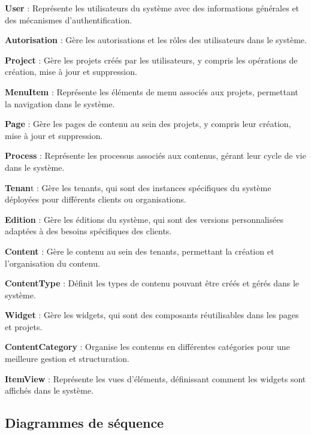 \textbf{User} : Représente les utilisateurs du système avec des informations générales et des mécanismes d'authentification.

\textbf{Autorisation} : Gère les autorisations et les rôles des utilisateurs dans le système.

\textbf{Project} : Gère les projets créés par les utilisateurs, y compris les opérations de création, mise à jour et suppression.

\textbf{MenuItem} : Représente les éléments de menu associés aux projets, permettant la navigation dans le système.

\textbf{Page} : Gère les pages de contenu au sein des projets, y compris leur création, mise à jour et suppression.

\textbf{Process} : Représente les processus associés aux contenus, gérant leur cycle de vie dans le système.

\textbf{Tenan}t : Gère les tenants, qui sont des instances spécifiques du système déployées pour différents clients ou organisations.

\textbf{Edition} : Gère les éditions du système, qui sont des versions personnalisées adaptées à des besoins spécifiques des clients.

\textbf{Content} : Gère le contenu au sein des tenants, permettant la création et l'organisation du contenu.

\textbf{ContentType} : Définit les types de contenu pouvant être créés et gérés dans le système.

\textbf{Widget} : Gère les widgets, qui sont des composants réutilisables dans les pages et projets.

\textbf{ContentCategory} : Organise les contenus en différentes catégories pour une meilleure gestion et structuration.

\textbf{ItemView} : Représente les vues d'éléments, définissant comment les widgets sont affichés dans le système.



\subsection{Diagrammes de séquence}

